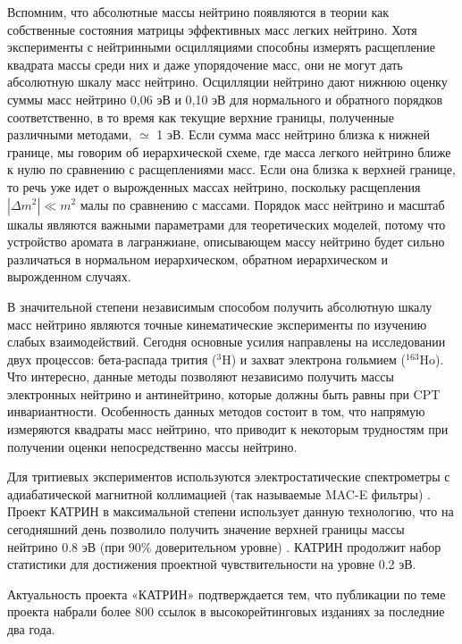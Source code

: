 ﻿\documentclass[a4paper,14pt]{extarticle}
\begin{document}
    Вспомним, что абсолютные массы нейтрино появляются в теории как собственные состояния матрицы 
    эффективных масс легких нейтрино. Хотя эксперименты с нейтринными осцилляциями способны измерять 
    расщепление квадрата массы среди них и даже упорядочение масс, они не могут дать абсолютную 
    шкалу масс нейтрино. Осцилляции нейтрино дают нижнюю оценку суммы масс нейтрино 0,06 эВ и 0,10 эВ 
    для нормального и обратного порядков соответственно, в то время как текущие верхние границы, полученные 
    различными методами, $\simeq$ 1 эВ. Если сумма масс нейтрино близка к нижней границе, мы говорим 
    об иерархической схеме, где масса легкого нейтрино ближе к нулю по сравнению с расщеплениями масс. 
    Если она близка к верхней границе, то речь уже идет о вырожденных массах нейтрино, поскольку расщепления 
    $|\Delta m^2| \ll m^2 $ малы по сравнению с массами. Порядок масс нейтрино и масштаб шкалы являются
    важными параметрами для теоретических моделей, потому что устройство аромата в лагранжиане, описывающем 
    массу нейтрино будет сильно различаться в нормальном иерархическом, обратном иерархическом и вырожденном случаях. 
    
    В значительной степени независимым способом получить абсолютную шкалу масс нейтрино 
    являются точные кинематические эксперименты по изучению слабых взаимодействий. Сегодня 
    основные усилия направлены на исследовании двух процессов: бета-распада трития ($^{3}$H) и 
    захват электрона гольмием ($^{163}$Ho). Что интересно, данные методы позволяют независимо 
    получить массы электронных нейтрино и антинейтрино, которые должны быть равны при CPT 
    инвариантности. Особенность данных методов состоит в том, что напрямую измеряются квадраты
    масс нейтрино, что приводит к некоторым трудностям при получении оценки непосредственно массы нейтрино. 
    
    Для тритиевых экспериментов используются электростатические спектрометры с адиабатической магнитной коллимацией (так называемые MAC-E фильтры) \cite{lobashev} \cite{picard}.
    Проект КАТРИН в максимальной степени использует данную технологию, что на сегодняшний день позволило
    получить значение верхней границы массы нейтрино 0.8 эВ (при 90\% доверительном уровне) \cite{aker}.
    КАТРИН продолжит набор статистики для достижения проектной чувствительности на уровне 0.2 эВ.
    
    
    Актуальность проекта «КАТРИН» подтверждается  
    тем, что публикации по теме проекта набрали более 800 ссылок
    в высокорейтинговых изданиях за последние два года.
\end{document}
